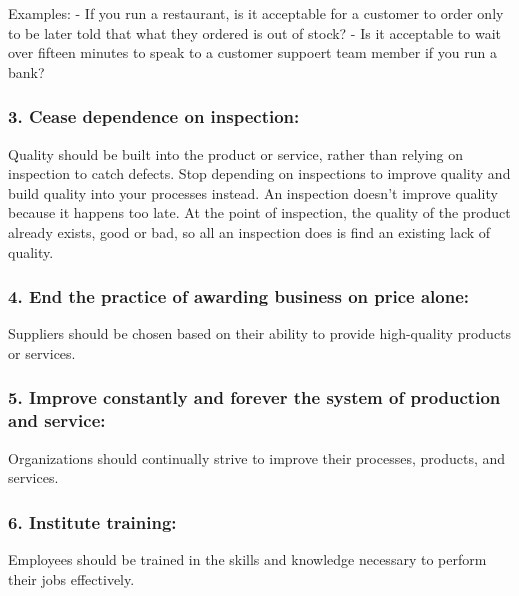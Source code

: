 \documentclass[11pt]{article}
\begin{document}
Examples: - If you run a restaurant, is it acceptable for a customer to
order only to be later told that what they ordered is out of stock? - Is
it acceptable to wait over fifteen minutes to speak to a customer
suppoert team member if you run a bank?

\hypertarget{cease-dependence-on-inspection}{%
\subsubsection{3. Cease dependence on
inspection:}\label{cease-dependence-on-inspection}}

Quality should be built into the product or service, rather than relying
on inspection to catch defects. Stop depending on inspections to improve
quality and build quality into your processes instead. An inspection
doesn't improve quality because it happens too late. At the point of
inspection, the quality of the product already exists, good or bad, so
all an inspection does is find an existing lack of quality.

\hypertarget{end-the-practice-of-awarding-business-on-price-alone}{%
\subsubsection{4. End the practice of awarding business on price
alone:}\label{end-the-practice-of-awarding-business-on-price-alone}}

Suppliers should be chosen based on their ability to provide
high-quality products or services.

\hypertarget{improve-constantly-and-forever-the-system-of-production-and-service}{%
\subsubsection{5. Improve constantly and forever the system of
production and
service:}\label{improve-constantly-and-forever-the-system-of-production-and-service}}

Organizations should continually strive to improve their processes,
products, and services.

\hypertarget{institute-training}{%
\subsubsection{6. Institute training:}\label{institute-training}}

Employees should be trained in the skills and knowledge necessary to
perform their jobs effectively.
\end{document}
